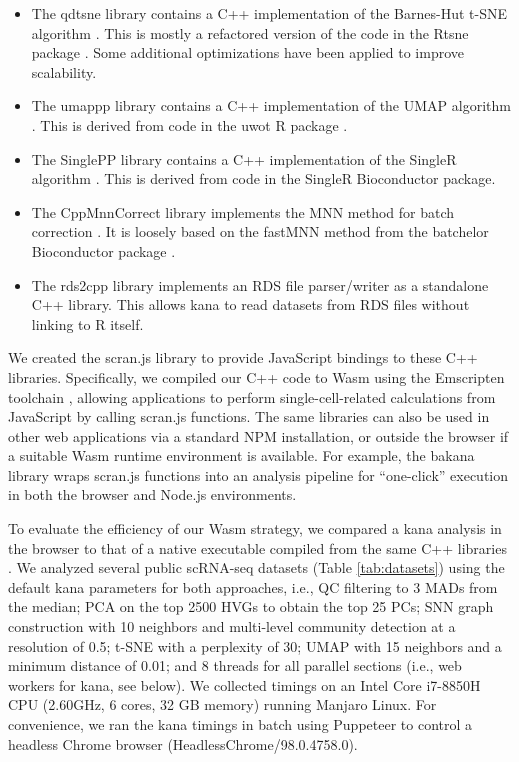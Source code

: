 \documentclass{article}
\begin{document}
\begin{itemize}
\item The qdtsne library \cite{qdtsne} contains a C++ implementation of the Barnes-Hut t-SNE algorithm \cite{maaten2014accelerating}.
This is mostly a refactored version of the code in the Rtsne package \cite{rtsne}.
Some additional optimizations have been applied to improve scalability.
\item The umappp library \cite{umappp} contains a C++ implementation of the UMAP algorithm \cite{mcinnes2018umap}.
This is derived from code in the uwot R package \cite{uwot}.
\item The SinglePP library \cite {singlepp} contains a C++ implementation of the SingleR algorithm \cite{aran2019reference}.
This is derived from code in the SingleR Bioconductor package. 
\item The CppMnnCorrect library \cite{cppmnncorrect} implements the MNN method for batch correction \cite{haghverdi2018batch}.
It is loosely based on the fastMNN method from the batchelor Bioconductor package \cite{batchelorbioc}.
\item The rds2cpp library \cite{rds2cpp} implements an RDS file parser/writer as a standalone C++ library.
This allows kana to read datasets from RDS files without linking to R itself. 
\end{itemize}

We created the scran.js library \cite{scran.js} to provide JavaScript bindings to these C++ libraries.
Specifically, we compiled our C++ code to Wasm using the Emscripten toolchain \cite{zakai2011emscripten},
allowing applications to perform single-cell-related calculations from JavaScript by calling scran.js functions. 
The same libraries can also be used in other web applications via a standard NPM installation, 
or outside the browser if a suitable Wasm runtime environment is available.
For example, the bakana library wraps scran.js functions into an analysis pipeline for ``one-click'' execution in both the browser and Node.js environments.

To evaluate the efficiency of our Wasm strategy, 
we compared a kana analysis in the browser to that of a native executable compiled from the same C++ libraries \cite{scrancli}.
We analyzed several public scRNA-seq datasets (Table \ref{tab:datasets}) using the default kana parameters for both approaches, i.e.,
QC filtering to 3 MADs from the median;
PCA on the top 2500 HVGs to obtain the top 25 PCs;
SNN graph construction with 10 neighbors and multi-level community detection at a resolution of 0.5;
t-SNE with a perplexity of 30;
UMAP with 15 neighbors and a minimum distance of 0.01;
and 8 threads for all parallel sections (i.e., web workers for kana, see below).
We collected timings on an Intel Core i7-8850H CPU (2.60GHz, 6 cores, 32 GB memory) running Manjaro Linux.
For convenience, we ran the kana timings in batch using Puppeteer \cite{puppeteer} to control a headless Chrome browser (HeadlessChrome/98.0.4758.0). 
\end{document}
